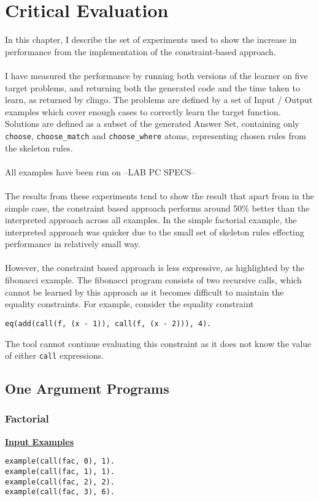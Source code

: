 \chapter{Critical Evaluation}

In this chapter, I describe the set of experiments used to show the increase in performance from the implementation of the constraint-based approach. \\ \\
I have measured the performance by running both versions of the learner on five target problems, and returning both the generated code and the time taken to learn, as returned by clingo. The problems are defined by a set of Input / Output examples which cover enough cases to correctly learn the target function. Solutions are defined as a subset of the generated Answer Set, containing only \lstinline{choose}, \lstinline{choose_match} and \lstinline{choose_where} atoms, representing chosen rules from the skeleton rules. \\ \\%
All examples have been run on --LAB PC SPECS-- \\ \\
The results from these experiments tend to show the result that apart from in the simple case, the constraint based approach performs around 50\% better than the interpreted approach across all examples. In the simple factorial example, the interpreted approach was quicker due to the small set of skeleton rules effecting performance in relatively small way. \\ \\
However, the constraint based approach is less expressive, as highlighted by the fibonacci example. The fibonacci program consists of two recursive calls, which cannot be learned by this approach as it becomes difficult to maintain the equality constraints. For example, consider the equality constraint
\begin{lstlisting}
eq(add(call(f, (x - 1)), call(f, (x - 2))), 4).
\end{lstlisting}
The tool cannot continue evaluating this constraint as it does not know the value of either \lstinline{call} expressions.

\pagebreak
\section{One Argument Programs}

\subsection{Factorial}
\underline{\textbf{Input Examples}}
\begin{lstlisting}
example(call(fac, 0), 1).
example(call(fac, 1), 1).
example(call(fac, 2), 2).
example(call(fac, 3), 6).
\end{lstlisting}

